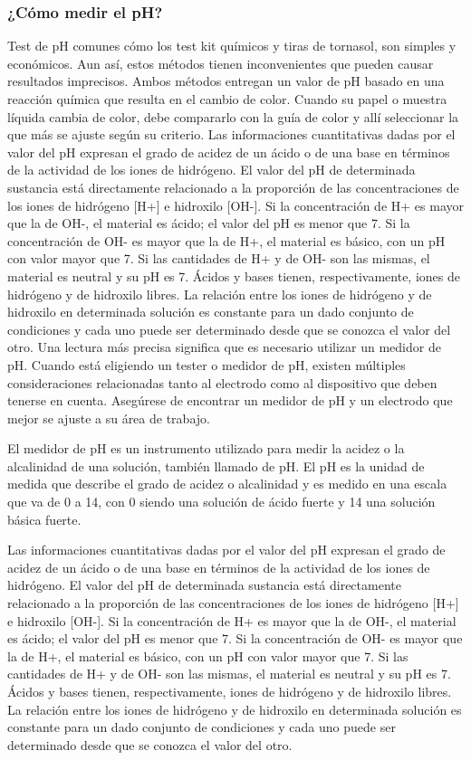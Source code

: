 \subsubsection{¿Cómo medir el pH?}
Test de pH comunes cómo los test kit químicos y tiras de tornasol, son simples y económicos. 
Aun así, estos métodos tienen inconvenientes que pueden causar resultados imprecisos. 
Ambos métodos entregan un valor de pH basado en una reacción química que resulta en el cambio de color. 
Cuando su papel o muestra líquida cambia de color, debe compararlo con la guía de color y allí seleccionar la que más se ajuste según su criterio.
Las informaciones cuantitativas dadas por el valor del pH expresan el grado de acidez de un ácido o de una base en términos de la actividad de los iones de hidrógeno. 
El valor del pH de determinada sustancia está directamente relacionado a la proporción de las concentraciones de los iones de hidrógeno [H+] e hidroxilo [OH-]. 
Si la concentración de H+ es mayor que la de OH-, el material es ácido; el valor del pH es menor que 7. 
Si la concentración de OH- es mayor que la de H+, el material es básico, con un pH con valor mayor que 7. 
Si las cantidades de H+ y de OH- son las mismas, el material es neutral y su pH es 7. Ácidos y bases tienen, respectivamente, iones de hidrógeno y de hidroxilo libres. 
La relación entre los iones de hidrógeno y de hidroxilo en determinada solución es constante para un dado conjunto de condiciones y cada uno puede ser determinado desde que se conozca el valor del otro.
Una lectura más precisa significa que es necesario utilizar un medidor de pH. 
Cuando está eligiendo un tester o medidor de pH, existen múltiples consideraciones relacionadas tanto al electrodo como al dispositivo que deben tenerse en cuenta. 
Asegúrese de encontrar un medidor de pH y un electrodo que mejor se ajuste a su área de trabajo.


El medidor de pH es un instrumento utilizado para medir la acidez o la alcalinidad de una solución, también llamado de pH. El pH es la unidad de medida que describe el grado de acidez o alcalinidad y es medido en una escala que va de 0 a 14, con 0 siendo una solución de ácido fuerte y 14 una solución básica fuerte.

Las informaciones cuantitativas dadas por el valor del pH expresan el grado de acidez de un ácido o de una base en términos de la actividad de los iones de hidrógeno. El valor del pH de determinada sustancia está directamente relacionado a la proporción de las concentraciones de los iones de hidrógeno [H+] e hidroxilo [OH-]. Si la concentración de H+ es mayor que la de OH-, el material es ácido; el valor del pH es menor que 7. Si la concentración de OH- es mayor que la de H+, el material es básico, con un pH con valor mayor que 7. Si las cantidades de H+ y de OH- son las mismas, el material es neutral y su pH es 7. Ácidos y bases tienen, respectivamente, iones de hidrógeno y de hidroxilo libres. La relación entre los iones de hidrógeno y de hidroxilo en determinada solución es constante para un dado conjunto de condiciones y cada uno puede ser determinado desde que se conozca el valor del otro.


